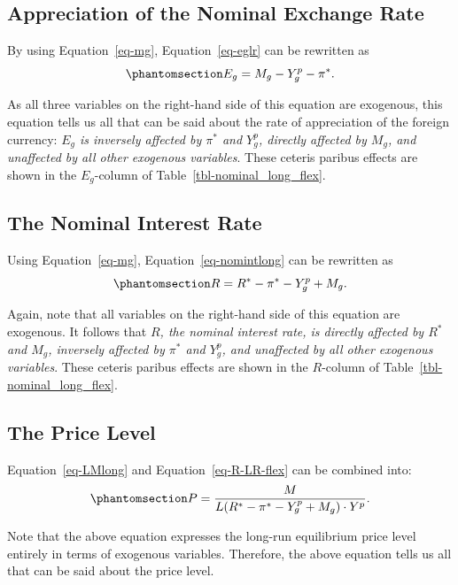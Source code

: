 \documentclass[
  letterpaper,
]{book}
\theoremstyle{plain}
\theoremstyle{remark}
\begin{document}
\subsection{Appreciation of the Nominal Exchange Rate}\label{sec-egflex}

By using Equation~\ref{eq-mg}, Equation~\ref{eq-eglr} can be rewritten
as \begin{equation}\phantomsection\label{eq-egflex}{
E_g=M_g-Y^p_g-\pi^*.
}\end{equation}

As all three variables on the right-hand side of this equation are
exogenous, this equation tells us all that can be said about the rate of
appreciation of the foreign currency: \emph{\(E_g\) is inversely
affected by \(\pi^*\) and \(Y^p_g\), directly affected by \(M_g\), and
unaffected by all other exogenous variables}. These ceteris paribus
effects are shown in the \(E_g\)-column of
Table~\ref{tbl-nominal_long_flex}.

\subsection{The Nominal Interest Rate}\label{sec-R-LR-flex}

Using Equation~\ref{eq-mg}, Equation~\ref{eq-nomintlong} can be
rewritten as \begin{equation}\phantomsection\label{eq-R-LR-flex}{
R=R^*-\pi^*- Y^p_g+M_g.
}\end{equation}

Again, note that all variables on the right-hand side of this equation
are exogenous. It follows that \emph{\(R\), the nominal interest rate,
is directly affected by \(R^*\) and \(M_g\), inversely affected by
\(\pi^*\) and \(Y^p_g\), and unaffected by all other exogenous
variables}. These ceteris paribus effects are shown in the \(R\)-column
of Table~\ref{tbl-nominal_long_flex}.

\subsection{The Price Level}\label{sec-pflex}

Equation~\ref{eq-LMlong} and Equation~\ref{eq-R-LR-flex} can be combined
into: \begin{equation}\phantomsection\label{eq-pflex}{
P=\frac {M}{L(R^*-\pi^*- Y^p_g+M_g)\cdot Y^p}.
}\end{equation}

Note that the above equation expresses the long-run equilibrium price
level entirely in terms of exogenous variables. Therefore, the above
equation tells us all that can be said about the price level.
\end{document}
